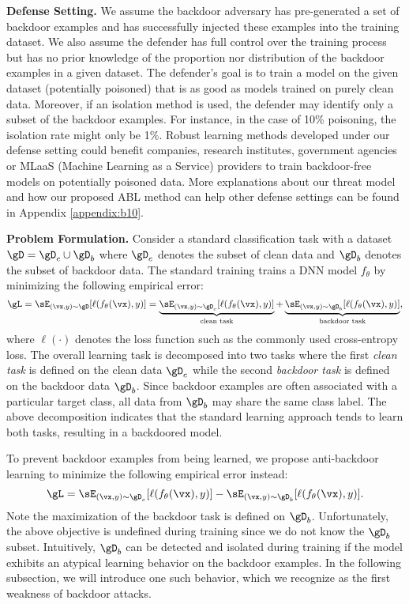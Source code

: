 \noindent\textbf{Defense Setting.} We assume the backdoor adversary has pre-generated a set of backdoor examples and has successfully injected these examples into the training dataset. We also assume the defender has full control over the training process but has no prior knowledge of the proportion nor distribution of the backdoor examples in a given dataset. The defender's goal is to train a model on the given dataset (potentially poisoned) that is as good as models trained on purely clean data. Moreover, if an isolation method is used, the defender may identify only a subset of the backdoor examples. For instance, in the case of 10\% poisoning, the isolation rate might only be 1\%.
Robust learning methods developed under our defense setting could benefit companies, research institutes, government agencies or MLaaS (Machine Learning as a Service) providers to train backdoor-free models on potentially poisoned data. More explanations about our threat model and how our proposed ABL method can help other defense settings can be found in Appendix \ref{appendix:b10}.

\noindent\textbf{Problem Formulation.}
Consider a standard classification task with a dataset $\gD=\gD_c \cup \gD_b$ where $\gD_c$ denotes the subset of clean data and $\gD_b$ denotes the subset of backdoor data. The standard training trains a DNN model $f_{\theta}$ by minimizing the following empirical error:
\begin{equation}\label{eq:std}
     \gL = \sE_{(\vx, y) \sim \gD} [\ell(f_{\theta}(\vx), y)] = \underbrace{\sE_{(\vx, y) \sim \gD_c} [\ell(f_{\theta}(\vx), y)]}_{\textup{clean task}} + \underbrace{\sE_{(\vx, y) \sim \gD_b} [\ell(f_{\theta}(\vx), y)]}_{\textup{backdoor task}},
\end{equation}
where $\ell(\cdot)$ denotes the loss function such as the commonly used cross-entropy loss. The overall learning task is decomposed into two tasks where the first \emph{clean task} is defined on the clean data $\gD_c$ while the second \emph{backdoor task} is defined on the backdoor data $\gD_b$. Since backdoor examples are often associated with a particular target class, all data from $\gD_b$ may share the same class label. The above decomposition indicates that the standard learning approach tends to learn both tasks, resulting in a backdoored model. 

To prevent backdoor examples from being learned, we propose anti-backdoor learning to minimize the following empirical error instead:
\begin{equation}\label{eq:anti}
     \gL = \sE_{(\vx, y) \sim \gD_c} [\ell(f_{\theta}(\vx), y)] - \sE_{(\vx, y) \sim \gD_b} [\ell(f_{\theta}(\vx), y)].
\end{equation}
Note the maximization of the backdoor task is defined on $\gD_b$. Unfortunately, the above objective is undefined during training since we do not know the $\gD_b$ subset. Intuitively, $\gD_b$ can be detected and isolated during training if the model exhibits an atypical learning behavior on the backdoor examples.  In the following subsection, we will introduce one such behavior, which we recognize as the first weakness of backdoor attacks.

